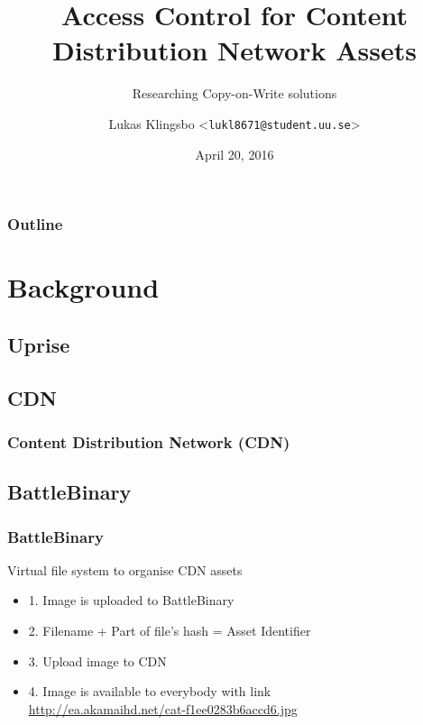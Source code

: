 \documentclass{beamer}
\title{Access Control for Content Distribution Network Assets}
\subtitle{Researching Copy-on-Write solutions}
\author[Lukas Klingsbo | \emph{lukl8671@student.uu.se}] %
{Lukas Klingsbo <\texttt{lukl8671@student.uu.se}>}
\institute[Dept.\ of Information Technology]%
{Department of Information Technology\\Uppsala University}
\date[]
{April 20, 2016}
\begin{document}
\begin{frame}[plain] %
  \titlepage
\end{frame}

\begin{frame}
    \frametitle{Outline}
    \setcounter{tocdepth}{2}
    \tableofcontents[]
\end{frame}

\section{Background}

\subsection{Uprise}
\begin{frame}
  \frametitle{}
  \centerline{}
  \vspace{30pt}
  \centerline{}
  \vspace{10pt}
  \centerline{}
  \vspace{10pt}
  \centerline{}
\end{frame}

\subsection{CDN}
\begin{frame}
  \frametitle{Content Distribution Network (CDN)}
  \centerline{}
\end{frame}

\subsection{BattleBinary}
\begin{frame}
  \frametitle{BattleBinary}
  Virtual file system to organise CDN assets
  \centerline{}
  \begin{itemize}
    \item{1. Image is uploaded to BattleBinary}
    \pause
    \item{2. Filename + Part of file's hash = Asset Identifier}
    \pause
    \item{3. Upload image to CDN}
    \pause
    \item{4. Image is available to everybody with
             link\\ \url{http://ea.akamaihd.net/cat-f1ee0283b6accd6.jpg}}
  \end{itemize}
\end{frame}
\end{document}
